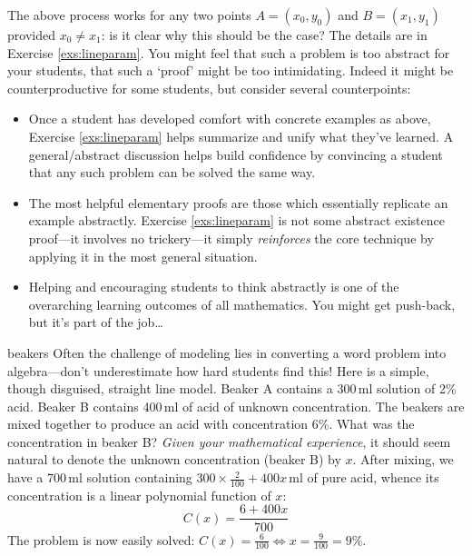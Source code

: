 The above process works for any two points $A=(x_0,y_0)$ and $B=(x_1,y_1)$ provided $x_0\neq x_1$: is it clear why this should be the case? The details are in Exercise \ref{exs:lineparam}. You might feel that such a problem is too abstract for your students, that such a `proof' might be too intimidating. Indeed it might be counterproductive for some students, but consider several counterpoints:
\begin{itemize}
  \item Once a student has developed comfort with concrete examples as above, Exercise \ref{exs:lineparam} helps summarize and unify what they've learned. A general/abstract discussion helps build confidence by convincing a student that any such problem can be solved the same way.
  \item The most helpful elementary proofs are those which essentially replicate an example abstractly. Exercise \ref{exs:lineparam} is not some abstract existence proof---it involves no trickery---it simply \emph{reinforces} the core technique by applying it in the most general situation.
  \item Helping and encouraging students to think abstractly is one of the overarching learning outcomes of all mathematics. You might get push-back, but it's part of the job\ldots
\end{itemize}


\goodbreak


\begin{example}{}{beakers}
	Often the challenge of modeling lies in converting a word problem into algebra---don't underestimate how hard students find this! Here is a simple, though disguised, straight line model.\smallbreak
	Beaker A contains a 300\,ml solution of 2\% acid. Beaker B contains 400\,ml of acid of unknown concentration. The beakers are mixed together to produce an acid with concentration 6\%. What was the concentration in beaker B?\smallbreak
	\emph{Given your mathematical experience}, it should seem natural to denote the unknown concentration (beaker B) by $x$. After mixing, we have a 700\,ml solution containing $300\times\frac 2{100}+400x$\,ml of pure acid, whence its concentration is a linear polynomial function of $x$:
	\[
	 C(x)=\frac{6+400x}{700}
	\]
	The problem is now easily solved: $C(x)=\frac 6{100}\Longleftrightarrow x=\frac 9{100}=9\%$.
\end{example}



\label{pg:paramline}

